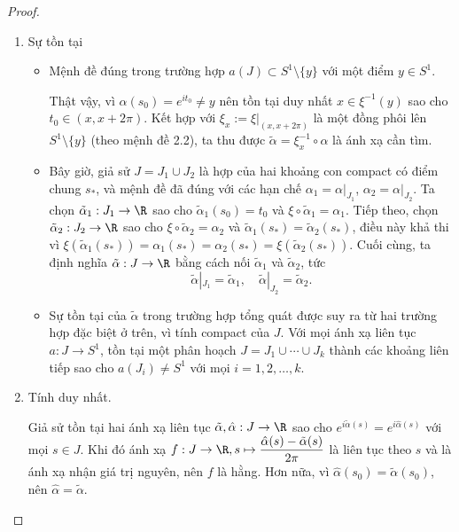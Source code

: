 	\begin{proof}
		\begin{enumerate}
			\item %
			Sự tồn tại
			\begin{itemize}
				\item Mệnh đề đúng trong trường hợp $a(J) \subset S^1 \setminus \{y\}$ với một điểm $y \in S^1$.
				
				Thật vậy, vì $\alpha(s_0) = e^{it_0} \neq y$ nên tồn tại duy nhất $x \in \xi^{-1}(y)$ sao cho $t_0 \in (x, x + 2\pi)$. Kết hợp với $\xi_x := \xi|_{(x, x + 2\pi)}$ là một đồng phôi lên $S^1 \setminus \{y\}$ (theo mệnh đề 2.2), ta thu được $\tilde{\alpha} = \xi_x^{-1} \circ \alpha$ là ánh xạ cần tìm.
				
				\item Bây giờ, giả sử $J = J_1 \cup J_2$ là hợp của hai khoảng con compact có điểm chung $s_*$, và mệnh đề đã đúng với các hạn chế $\alpha_1 = \alpha|_{J_1}$, $\alpha_2 = \alpha|_{J_2}$.
				Ta chọn $\tilde{\alpha}_1: J_1 \to \R$ sao cho $\tilde{\alpha}_1(s_0) = t_0$ và $\xi \circ \tilde{\alpha}_1 = \alpha_1$.
				Tiếp theo, chọn $\tilde{\alpha}_2: J_2 \to \R$ sao cho $\xi \circ \tilde{\alpha}_2 = \alpha_2$ và $\tilde{\alpha}_1(s_*) = \tilde{\alpha}_2(s_*)$, điều này khả thi vì $\xi(\tilde{\alpha}_1(s_*)) = \alpha_1(s_*) = \alpha_2(s_*) = \xi(\tilde{\alpha}_2(s_*))$.
				Cuối cùng, ta định nghĩa $\tilde{\alpha}: J \to \R$ bằng cách nối $\tilde{\alpha}_1$ và $\tilde{\alpha}_2$, tức
				\[
				\tilde{\alpha}|_{J_1} = \tilde{\alpha}_1, \quad \tilde{\alpha}|_{J_2} = \tilde{\alpha}_2.
				\]
				
				\item Sự tồn tại của $\tilde{\alpha}$ trong trường hợp tổng quát được suy ra từ hai trường hợp đặc biệt ở trên, vì tính compact của $J$. Với mọi ánh xạ liên tục $a: J \to S^1$, tồn tại một phân hoạch $J = J_1 \cup \cdots \cup J_k$ thành các khoảng liên tiếp sao cho $a(J_i) \ne S^1$ với mọi $i = 1, 2, \dots, k$.
			\end{itemize}
			\item %
			Tính duy nhất.
			
			Giả sử tồn tại hai ánh xạ liên tục $\tilde{\alpha}, \hat{\alpha}: J \to \R$ sao cho $e^{i\tilde{\alpha}(s)} = e^{i\hat{\alpha}(s)}$ với mọi $s \in J$. Khi đó ánh xạ $f:J\to \R, s\mapsto \dfrac{\hat{\alpha}(s) - \tilde{\alpha}(s)}{2\pi}$ là liên tục theo $s$ và 
			là ánh xạ nhận giá trị nguyên, nên $f$ là hằng. Hơn nữa, vì $\hat{\alpha}(s_0) = \tilde{\alpha}(s_0)$, nên $\hat{\alpha} = \tilde{\alpha}$.
		\end{enumerate}
	\end{proof}
